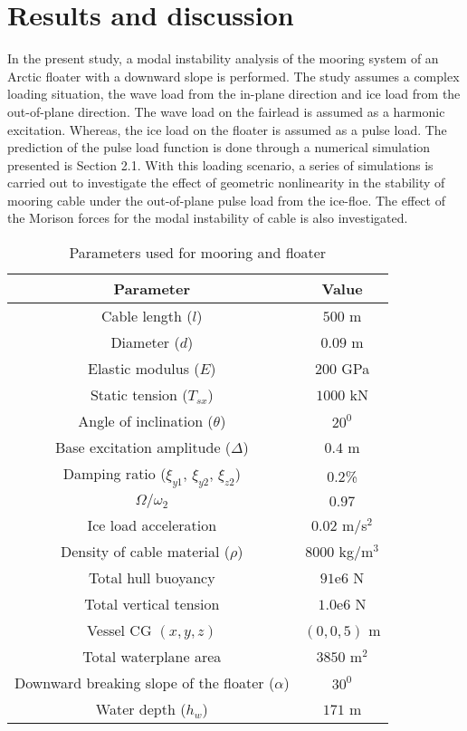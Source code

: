 \documentclass[review]{elsarticle}
\begin{document}
\section{Results and discussion}
In the present study, a modal instability analysis of the mooring system of an Arctic floater with a downward slope is performed. The study assumes a complex loading situation, the wave load from the in-plane direction and ice load from the out-of-plane direction. The wave load on the fairlead is assumed as a harmonic excitation. Whereas, the ice load on the floater is assumed as a pulse load. The prediction of the pulse load function is done through a numerical simulation presented is Section 2.1. With this loading scenario, a series of simulations is carried out to investigate the effect of geometric nonlinearity in the stability of mooring cable under the out-of-plane pulse load from the ice-floe. The effect of the Morison forces for the modal instability of cable is also investigated.
\begin{table}[]
	\centering
	\caption{Parameters used for mooring and floater}
	{\renewcommand{\arraystretch}{1.2}
		\begin{tabular}{|c|c|}
			\hline
			{Parameter} & {Value} \\ \hline
			Cable length ($l$) & $500$ m \\ \hline 
			Diameter ($d$) & $0.09$ m \\ \hline 
			Elastic modulus ($E$) & $200$ GPa \\ \hline 
			Static tension ($T_{sx}$) & $1000$ kN \\ \hline 
			Angle of inclination ($\theta$) & $20^0$ \\ \hline 
			Base excitation amplitude ($\Delta$) & $0.4$ m \\ \hline 
			Damping ratio (${\xi }_{y1}$, ${\xi }_{y2}$, ${\xi }_{z2}$) & $0.2$\% \\ \hline 
			$\Omega/\omega_{2}$ & $0.97$ \\ \hline 
			Ice load acceleration & $0.02$ m/s$^{2}$ \\ \hline 
			Density of cable material ($\rho$) & $8000$ kg/m$^{3}$ \\ \hline 
			Total hull buoyancy & $91$e$6$ N \\ \hline 
			Total vertical tension & $1.0$e$6$ N \\ \hline 
			Vessel CG $(x, y, z)$ & $(0, 0, 5)$ m \\ \hline 
			Total waterplane area & $3850$ m$^{2}$ \\ \hline 
			Downward breaking slope of the floater ($\alpha$) & $30^{0}$ \\ \hline
			Water depth ($h_w$) & $171$ m \\ \hline
		\end{tabular}
	}
	\label{PU}
\end{table}
\end{document}
